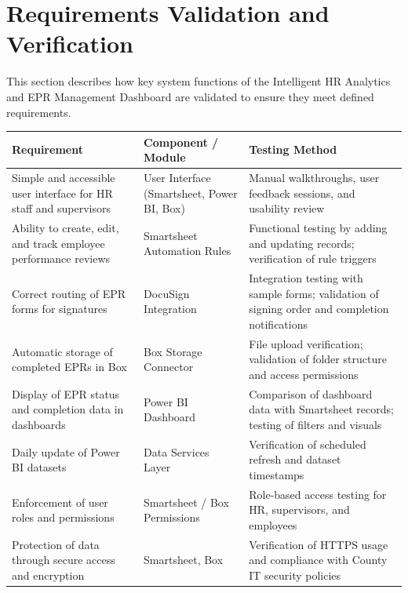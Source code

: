 \documentclass[12pt]{article}
\def\textbf#1{#1}%
\def\&{ and }%
\begin{document}
\section{Requirements Validation and Verification}

This section describes how key system functions of the Intelligent HR Analytics \& EPR Management Dashboard are validated to ensure they meet defined requirements.

\begin{tabular}{|p{5cm}|p{4cm}|p{7cm}|}
\hline
\textbf{Requirement} & \textbf{Component / Module} & \textbf{Testing Method} \\ \hline

Simple and accessible user interface for HR staff and supervisors &
User Interface (Smartsheet, Power BI, Box) &
Manual walkthroughs, user feedback sessions, and usability review \\ \hline

Ability to create, edit, and track employee performance reviews &
Smartsheet Automation Rules &
Functional testing by adding and updating records; verification of rule triggers \\ \hline

Correct routing of EPR forms for signatures &
DocuSign Integration &
Integration testing with sample forms; validation of signing order and completion notifications \\ \hline

Automatic storage of completed EPRs in Box &
Box Storage Connector &
File upload verification; validation of folder structure and access permissions \\ \hline

Display of EPR status and completion data in dashboards &
Power BI Dashboard &
Comparison of dashboard data with Smartsheet records; testing of filters and visuals \\ \hline

Daily update of Power BI datasets &
Data Services Layer &
Verification of scheduled refresh and dataset timestamps \\ \hline

Enforcement of user roles and permissions &
Smartsheet / Box Permissions &
Role-based access testing for HR, supervisors, and employees \\ \hline

Protection of data through secure access and encryption &
Smartsheet, Box &
Verification of HTTPS usage and compliance with County IT security policies \\ \hline


\end{tabular}
\end{document}

